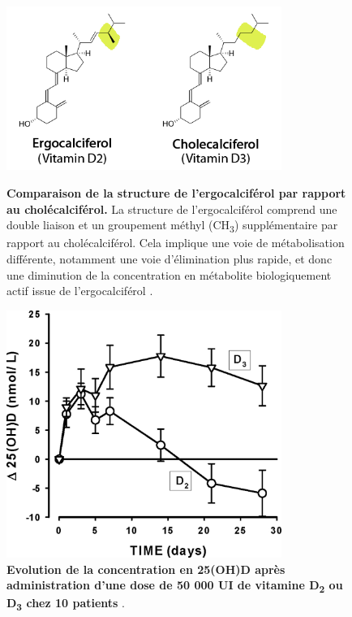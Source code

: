 \documentclass[
  a4paper,
  DIV=11,
  numbers=noendperiod,
  listof=totoc]{scrreprt}
\begin{document}
\begin{figure}[ht]
\centering
\includegraphics[width=0.8\textwidth]{figures/ergo_vs_chole.png}
\caption[Comparaison de la structure de l'ergocalciférol par rapport au cholécalciférol.]{\textbf{Comparaison de la structure de l'ergocalciférol par rapport au cholécalciférol.} La structure de l'ergocalciférol comprend une double liaison et un groupement méthyl (CH\textsubscript{3}) supplémentaire par rapport au cholécalciférol. Cela implique une voie de métabolisation différente, notamment une voie d'élimination plus rapide, et donc une diminution de la concentration en métabolite biologiquement actif issue de l'ergocalciférol \autocite{Houghton.2006}.}
\label{fig:ergo-struc}

\vspace{1em}

\includegraphics[width=0.8\textwidth]{figures/PK_D2_vs_D3.jpeg}
\caption[Evolution de la concentration en 25(OH)D après administration d'une dose de 50 000 UI de vitamine D\textsubscript{2} ou D\textsubscript{3} chez 10 patients.]{\textbf{Evolution de la concentration en 25(OH)D après administration d'une dose de 50 000 UI de vitamine D\textsubscript{2} ou D\textsubscript{3} chez 10 patients} \autocite{Armas.2004}.}
\label{fig:PK}
\end{figure}
\end{document}
